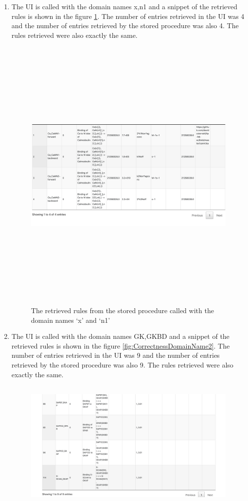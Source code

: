 \documentclass[msc,deptreport,ai]{infthesis}      %
\begin{document}
\begin{enumerate}
	\item The UI is called with the domain names x,n1 and a snippet of the retrieved rules is shown in the figure \ref{fig:CorrectnessDomainName1}. The number of entries retrieved in the UI was 4 and the number of entries retrieved by the stored procedure was also 4. The rules retrieved were also exactly the same.
	\begin{figure}[H]
		\centering
		\captionsetup{justification=centering}
		\includegraphics[width=\linewidth,height=14cm,keepaspectratio]{CorrectnessDomainName1.png}	
		\caption{The retrieved rules from the stored procedure called with the domain names `x' and `n1'}
		\label{fig:CorrectnessDomainName1}		
	\end{figure}
	\item The UI is called with the domain names GK,GKBD and a snippet of the retrieved rules is shown in the figure \ref{fig:CorrectnessDomainName2}. The number of entries retrieved in the UI was 9 and the number of entries retrieved by the stored procedure was also 9. The rules retrieved were also exactly the same.
	\begin{figure}[H]
		\centering
		\captionsetup{justification=centering}
		\includegraphics[width=\linewidth,height=6.5cm,keepaspectratio]{CorrectnessDomainName2.png}	

\end{figure}
\end{enumerate}
\end{document}
